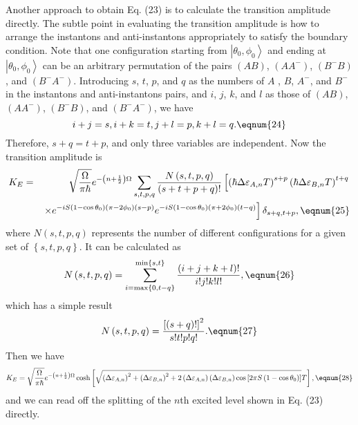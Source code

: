 Another approach to obtain Eq. (23) is to calculate the transition amplitude
directly. The subtle point in evaluating the transition amplitude is how to
arrange the instantons and anti-instantons appropriately to satisfy the
boundary condition. Note that one configuration starting from $\left| \theta
_0,\phi _0\right\rangle $ and ending at $\left| \theta _0,\phi
_0\right\rangle $ can be an arbitrary permutation of the pairs $\left(
AB\right) $, $\left( AA^{-}\right) $, $\left( B^{-}B\right) $, and $\left(
B^{-}A^{-}\right) $. Introducing $s$, $t$, $p$, and $q$ as the numbers of $A$%
, $B$, $A^{-}$, and $B^{-}$ in the instantons and anti-instantons pairs, and 
$i$, $j$, $k$, and $l$ as those of $\left( AB\right) $, $\left(
AA^{-}\right) $, $\left( B^{-}B\right) $, and $\left( B^{-}A^{-}\right) $,
we have 
\begin{equation}
i+j=s,i+k=t,j+l=p,k+l=q.  \eqnum{24}
\end{equation}
Therefore, $s+q=t+p$, and only three variables are independent. Now the
transition amplitude is 
\begin{eqnarray}
K_E &=&\sqrt{\frac \Omega {\pi \hbar }}e^{-\left( n+\frac 12\right) \Omega
}\sum_{s,t,p,q}\frac{N\left( s,t,p,q\right) }{\left( s+t+p+q\right) !}\left[
\left( \hbar \Delta \varepsilon _{A,n}T\right) ^{s+p}\left( \hbar \Delta
\varepsilon _{B,n}T\right) ^{t+q}\right.  \nonumber \\
&&\left. \times e^{-iS\left( 1-\cos \theta _0\right) \left( \pi -2\phi
_0\right) \left( s-p\right) }e^{-iS\left( 1-\cos \theta _0\right) \left( \pi
+2\phi _0\right) \left( t-q\right) }\right] \delta _{s+q,t+p},  \eqnum{25}
\end{eqnarray}
where $N\left( s,t,p,q\right) $ represents the number of different
configurations for a given set of $\left\{ s,t,p,q\right\} $. It can be
calculated as 
\begin{equation}
N\left( s,t,p,q\right) =\sum_{i=\max \left\{ 0,t-q\right\} }^{\min \left\{
s,t\right\} }\frac{\left( i+j+k+l\right) !}{i!j!k!l!},  \eqnum{26}
\end{equation}
which has a simple result 
\begin{equation}
N\left( s,t,p,q\right) =\frac{\left[ \left( s+q\right) !\right] ^2}{s!t!p!q!}%
.  \eqnum{27}
\end{equation}
Then we have 
\begin{equation}
K_E=\sqrt{\frac \Omega {\pi \hbar }}e^{-\left( n+\frac 12\right) \Omega
}\cosh \left[ \sqrt{\left( \Delta \varepsilon _{A,n}\right) ^2+\left( \Delta
\varepsilon _{B,n}\right) ^2+2\left( \Delta \varepsilon _{A,n}\right) \left(
\Delta \varepsilon _{B,n}\right) \cos \left[ 2\pi S\left( 1-\cos \theta
_0\right) \right] }T\right] ,  \eqnum{28}
\end{equation}
and we can read off the splitting of the $n$th excited level shown in Eq.
(23) directly.

